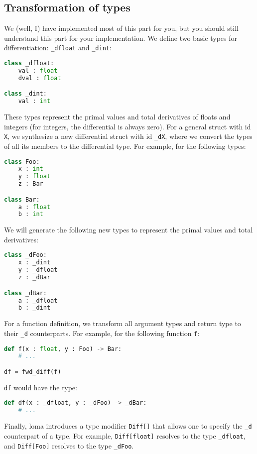 \subsection{Transformation of types}
We (well, I) have implemented most of this part for you, but you should still understand this part for your implementation. We define two basic types for differentiation: \lstinline{_dfloat} and \lstinline{_dint}:
\begin{lstlisting}[language=Python]
class _dfloat:
	val : float
	dval : float

class _dint:
	val : int
\end{lstlisting}
These types represent the primal values and total derivatives of floats and integers (for integers, the differential is always zero). For a general struct with id \lstinline{X}, we synthesize a new differential struct with id \lstinline{_dX}, where we convert the types of all its members to the differential type. For example, for the following types:
\begin{lstlisting}[language=Python]
class Foo:
	x : int
	y : float
	z : Bar

class Bar:
	a : float
	b : int
\end{lstlisting}
We will generate the following new types to represent the primal values and total derivatives:
\begin{lstlisting}[language=Python]
class _dFoo:
	x : _dint
	y : _dfloat
	z : _dBar

class _dBar:
	a : _dfloat
	b : _dint
\end{lstlisting}

For a function definition, we transform all argument types and return type to their \lstinline{_d} counterparts. For example, for the following function \lstinline{f}:
\begin{lstlisting}[language=Python]
def f(x : float, y : Foo) -> Bar:
	# ...

df = fwd_diff(f)
\end{lstlisting}
\lstinline{df} would have the type:
\begin{lstlisting}[language=Python]
def df(x : _dfloat, y : _dFoo) -> _dBar:
	# ...
\end{lstlisting}

Finally, loma introduces a type modifier \lstinline{Diff[]} that allows one to specify the \lstinline{_d} counterpart of a type. For example, \lstinline{Diff[float]} resolves to the type \lstinline{_dfloat}, and \lstinline{Diff[Foo]} resolves to the type \lstinline{_dFoo}. 

